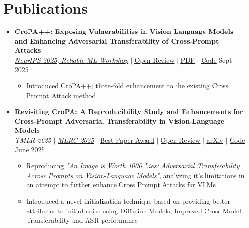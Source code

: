 \documentclass[letterpaper,11pt]{article}
\newcommand{\resumeItem}[1]{
  \item\small{
    {#1 \vspace{-2pt}}
  }
}
\begin{document}
\section{Publications}
    \begin{itemize}[leftmargin=0.15in, label={}]
    \item
        \textbf{CroPA++: Exposing Vulnerabilities in Vision Language Models and Enhancing Adversarial Transferability of Cross-Prompt Attacks} \\
        \href{https://reliablemlworkshop.github.io/}{\textit{NeurIPS 2025, Reliable ML Workshop}} 
        $|$
        \faEye { }\href{https://openreview.net/forum?id=gKtyvblq0Y}{\underline{Open Review}}
        $|$
        \faFilePdfO { }\href{https://openreview.net/pdf?id=gKtyvblq0Y}{\underline{PDF}}    
        $|$ 
        \faGithub { }\href{https://anonymous.4open.science/r/CroPA-CD38/README.md}{\underline{Code}}
        {\hfill Sept 2025}
          \begin{itemize}
            \resumeItem{Introduced CroPA++; three-fold enhancement to the existing Cross Prompt Attack method}
          \end{itemize}
    \item
    \textbf{Revisiting CroPA: A Reproducibility Study and Enhancements for Cross-Prompt Adversarial Transferability in Vision-Language Models} \\
    \textit{TMLR 2025} $|$
    \href{https://reproml.org/}{\textit{MLRC 2025}} $|$
    \faStar { }\href{https://x.com/repro_challenge/status/1954935709380247575}{\underline{Best Paper Award}}
    $|$ \faEye { }\href{https://openreview.net/forum?id=5L90cl0xtf&noteId=7yskfQI5KW}{\underline{Open Review}}
    $|$
    \faFilePdfO { }\href{https://arxiv.org/abs/2506.22982}{\underline{arXiv}}    
    $|$ 
    \faGithub { }\href{https://github.com/Swadesh06/Revisting_CroPA}{\underline{Code}}
    {\hfill June 2025}
      \begin{itemize}
        \resumeItem{Reproducing \textit{"An Image is Worth 1000 Lies: Adversarial Transferability Across Prompts on Vision-Language Models"}, analyzing it's limitations in an attempt to further enhance Cross Prompt Attacks for VLMs}
        \resumeItem{Introduced a novel initialization technique based on providing better attributes to initial noise using Diffusion Models, Improved Cross-Model Transferability and ASR performance}
      \end{itemize}


\end{itemize}
\end{document}
